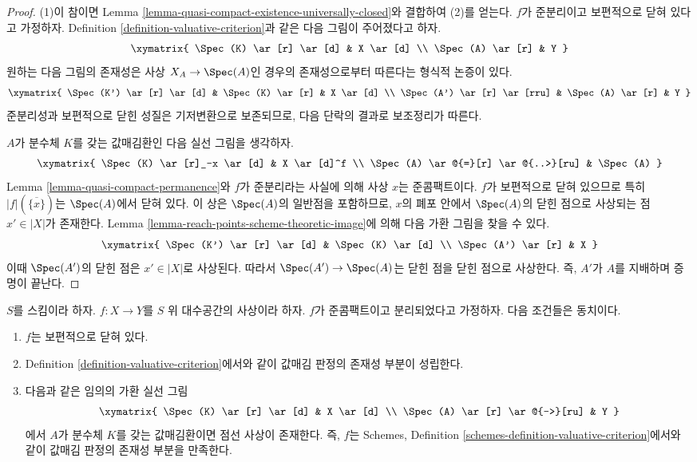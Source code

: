 \begin{proof}
(1)이 참이면 Lemma
\ref{lemma-quasi-compact-existence-universally-closed}와 결합하여
(2)를 얻는다. $f$가 준분리이고 보편적으로 닫혀 있다고 가정하자.
Definition \ref{definition-valuative-criterion}과 같은 다음 그림이
주어졌다고 하자.
$$
\xymatrix{
\Spec(K) \ar[r] \ar[d] & X \ar[d] \\
\Spec(A) \ar[r] & Y
}
$$
원하는 다음 그림의 존재성은 사상 $X_A \to \Spec(A)$인 경우의
존재성으로부터 따른다는 형식적 논증이 있다.
$$
\xymatrix{
\Spec(K') \ar[r] \ar[d] & \Spec(K) \ar[r] & X \ar[d] \\
\Spec(A') \ar[r] \ar[rru] & \Spec(A) \ar[r] & Y
}
$$
준분리성과 보편적으로 닫힌 성질은 기저변환으로 보존되므로,
다음 단락의 결과로 보조정리가 따른다.

\medskip\noindent
$A$가 분수체 $K$를 갖는 값매김환인 다음 실선 그림을 생각하자.
$$
\xymatrix{
\Spec(K) \ar[r]_-x \ar[d] & X \ar[d]^f \\
\Spec(A) \ar@{=}[r] \ar@{..>}[ru] & \Spec(A)
}
$$
Lemma \ref{lemma-quasi-compact-permanence}와 $f$가 준분리라는 사실에
의해 사상 $x$는 준콤팩트이다. $f$가 보편적으로 닫혀 있으므로 특히
$|f|(\overline{\{x\}})$는 $\Spec(A)$에서 닫혀 있다. 이 상은
$\Spec(A)$의 일반점을 포함하므로, $x$의 폐포 안에서
$\Spec(A)$의 닫힌 점으로 사상되는 점 $x' \in |X|$가 존재한다.
Lemma \ref{lemma-reach-points-scheme-theoretic-image}에 의해 다음
가환 그림을 찾을 수 있다.
$$
\xymatrix{
\Spec(K') \ar[r] \ar[d] & \Spec(K) \ar[d] \\
\Spec(A') \ar[r] & X
}
$$
이때 $\Spec(A')$의 닫힌 점은 $x' \in |X|$로 사상된다.
따라서 $\Spec(A') \to \Spec(A)$는 닫힌 점을 닫힌 점으로 사상한다.
즉, $A'$가 $A$를 지배하며 증명이 끝난다.
\end{proof}

\begin{lemma}
\label{lemma-characterize-universally-closed-separated}
$S$를 스킴이라 하자. $f : X \to Y$를 $S$ 위 대수공간의 사상이라 하자.
$f$가 준콤팩트이고 분리되었다고 가정하자. 다음 조건들은 동치이다.
\begin{enumerate}
\item $f$는 보편적으로 닫혀 있다.
\item Definition \ref{definition-valuative-criterion}에서와 같이
값매김 판정의 존재성 부분이 성립한다.
\item 다음과 같은 임의의 가환 실선 그림
$$
\xymatrix{
\Spec(K) \ar[r] \ar[d] & X \ar[d] \\
\Spec(A) \ar[r] \ar@{-->}[ru] & Y
}
$$
에서 $A$가 분수체 $K$를 갖는 값매김환이면 점선 사상이 존재한다. 즉,
$f$는 Schemes, Definition \ref{schemes-definition-valuative-criterion}에서와
같이 값매김 판정의 존재성 부분을 만족한다.
\end{enumerate}
\end{lemma}

